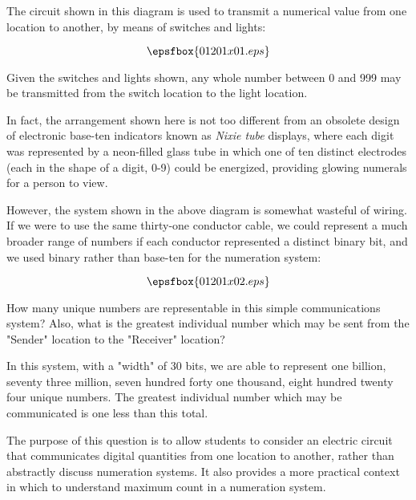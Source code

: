 

The circuit shown in this diagram is used to transmit a numerical value from one location to another, by means of switches and lights:

$$\epsfbox{01201x01.eps}$$

Given the switches and lights shown, any whole number between 0 and 999 may be transmitted from the switch location to the light location.

In fact, the arrangement shown here is not too different from an obsolete design of electronic base-ten indicators known as {\it Nixie tube} displays, where each digit was represented by a neon-filled glass tube in which one of ten distinct electrodes (each in the shape of a digit, 0-9) could be energized, providing glowing numerals for a person to view.

However, the system shown in the above diagram is somewhat wasteful of wiring.  If we were to use the same thirty-one conductor cable, we could represent a much broader range of numbers if each conductor represented a distinct binary bit, and we used binary rather than base-ten for the numeration system:

$$\epsfbox{01201x02.eps}$$

How many unique numbers are representable in this simple communications system?  Also, what is the greatest individual number which may be sent from the "Sender" location to the "Receiver" location?







In this system, with a "width" of 30 bits, we are able to represent one billion, seventy three million, seven hundred forty one thousand, eight hundred twenty four unique numbers.  The greatest individual number which may be communicated is one less than this total.







The purpose of this question is to allow students to consider an electric circuit that communicates digital quantities from one location to another, rather than abstractly discuss numeration systems.  It also provides a more practical context in which to understand maximum count in a numeration system.





